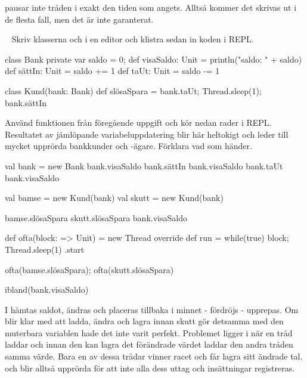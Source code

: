 \SubtaskSolved   {} pausar inte tråden i exakt den tiden som angets. Alltså kommer det skrivas ut  i de flesta fall, men det är inte garanterat.



\QUESTEND







\QUESTBEGIN

\Task \label{task:racecondition} \what~   Skriv klasserna  och  i en editor och klistra sedan in koden i REPL.

\begin{Code}
class Bank {
  private var saldo = 0;
  def visaSaldo: Unit = println("saldo: " + saldo)
  def sättIn: Unit = { saldo += 1 }
  def taUt: Unit   = { saldo -= 1 }
}

class Kund(bank: Bank) {
  def slösaSpara = {bank.taUt; Thread.sleep(1); bank.sättIn}
}
\end{Code}

\Subtask Använd funktionen  från föregående uppgift och kör nedan rader i REPL. Resultatet av jämlöpande variabeluppdatering blir här heltokigt och leder till mycket upprörda bankkunder och -ägare. Förklara vad som händer.

\begin{REPL}
val bank = new Bank
bank.visaSaldo
bank.sättIn
bank.visaSaldo
bank.taUt
bank.visaSaldo

val bamse = new Kund(bank)
val skutt = new Kund(bank)

bamse.slösaSpara
skutt.slösaSpara
bank.visaSaldo

def ofta(block: => Unit) = new Thread {
  override def run = while(true) { block; Thread.sleep(1) }
}.start

ofta(bamse.slösaSpara); ofta(skutt.slösaSpara)

ibland(bank.visaSaldo)
\end{REPL}


\SOLUTION


\TaskSolved \what

\SubtaskSolved  I  hämtas saldot, ändras och placeras tillbaka i minnet -  fördröjs -  upprepas. Om  blir klar med att ladda, ändra och lagra innan skutt gör detsamma med den muterbara variablen hade det inte varit perfekt. Problemet ligger i  när en tråd laddar och innan den kan lagra det förändrade värdet laddar den andra tråden samma värde. Bara en av dessa trådar vinner racet och får lagra sitt ändrade tal.  och  blir alltså upprörda för att inte alla dess uttag och insättningar registreras.


